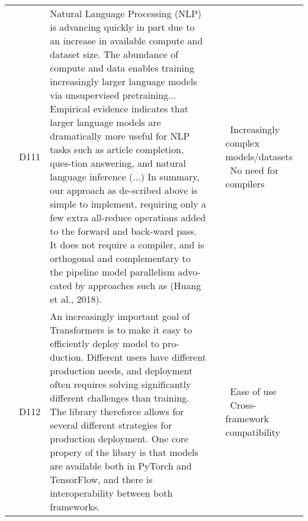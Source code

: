 {\begin{longtable}[H]{|l|p{0.6cm}|p{11.8cm}|p{0.6cm}|p{2cm}|}
         & \label{D111}D111\newline\centering\cite{shoeybi_megatron-lm_2020} & Natural Language Processing (NLP) is advancing quickly in part due to an increase in available compute and dataset size. The abundance of compute and data enables training increasingly larger language models via unsupervised pretraining... Empirical evidence indicates that larger language models are dramatically more useful for NLP tasks such as article completion, ques-tion answering, and natural language inference (...) In summary, our approach as de-scribed above is simple to implement, requiring only a few extra all-reduce operations added to the forward and back-ward pass. It does not require a compiler, and is orthogonal and complementary to the pipeline model parallelism advo-cated by approaches such as (Huang et al., 2018).
	     & \cite{shoeybi_megatron-lm_2020,chen_mxnet_2015,lepikhin_gshard_2020}
	     & \textbullet\ Increasingly complex models/datasets \newline \textbullet\ No need for compilers \\ \cline{2-5}
         & \label{D112}D112\newline\centering\cite{wolf_huggingfaces_2020} & An increasingly important goal of Transformers is to make it easy to efficiently deploy model to pro-duction. Different users have different production needs, and deployment often requires solving significantly different challenges than training. The library thereforce allows for several different strategies for production deployment.
         One core propery of the libary is that models are available both in PyTorch and TensorFlow, and there is interoperability between both frameworks. 
	     & \cite{wolf_huggingfaces_2020,sergeev_horovod_2018,rasley_deepspeed_2020}
	     & \textbullet\ Ease of use \newline \textbullet\ Cross-framework compatibility \\ \hline


\end{longtable}}
